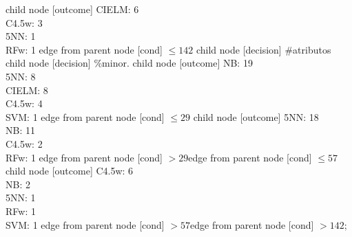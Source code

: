 child {node [outcome] {CIELM: 6\\
C4.5w: 3\\
5NN: 1\\
RFw: 1} edge from parent node [cond] {$\leq142$}}
child {node [decision] {\#atributos}
child {node [decision] {\%minor.}
child {node [outcome] {NB: 19\\
5NN: 8\\
CIELM: 8\\
C4.5w: 4\\
SVM: 1} edge from parent node [cond] {$\leq29$}}
child {node [outcome] {5NN: 18\\
NB: 11\\
C4.5w: 2\\
RFw: 1} edge from parent node [cond] {$>29$}}edge from parent node [cond] {$\leq57$}}
child {node [outcome] {C4.5w: 6\\
NB: 2\\
5NN: 1\\
RFw: 1\\
SVM: 1} edge from parent node [cond] {$>57$}}edge from parent node [cond] {$>142$}};